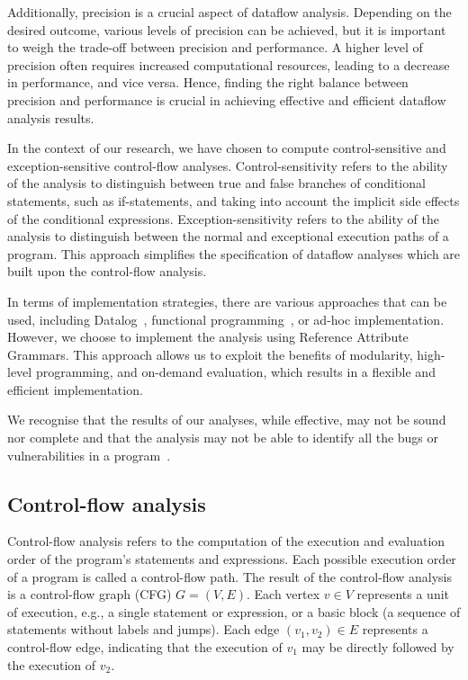 Additionally, precision is a crucial aspect of dataflow analysis.
Depending on the desired outcome, various levels of precision can be achieved,
but it is important to weigh the trade-off between precision and performance.
A higher level of precision often requires increased computational resources,
leading to a decrease in performance, and vice versa. Hence, finding the right
balance between precision and performance is crucial in achieving effective and
efficient dataflow analysis results.

In the context of our research, we have chosen to compute control-sensitive and
exception-sensitive control-flow analyses.
Control-sensitivity refers to the ability of the analysis to distinguish between
true and false branches of conditional statements, such as if-statements, and
taking into account the implicit side effects of the conditional expressions.
Exception-sensitivity refers to the ability of the analysis to distinguish between
the normal and exceptional execution paths of a program.
This approach simplifies the specification of dataflow analyses which are built upon the
control-flow analysis.

In terms of implementation strategies, there are various approaches that can be
used, including Datalog~\cite{dura2021javadl}, functional programming~\cite{madsen2016datalog}, or ad-hoc implementation.
However, we choose to implement the analysis using Reference Attribute Grammars.
This approach allows us to exploit the benefits of modularity, high-level programming,
and on-demand evaluation, which results in a flexible and efficient implementation.

We recognise that the results of our analyses, while effective,
may not be sound nor complete and that the analysis may not be able to identify
all the bugs or vulnerabilities in a program~\cite{livshits2015defense}.





\subsection{Control-flow analysis}
Control-flow analysis refers to the computation of
 the execution and evaluation order of the program's statements and expressions.
Each possible execution order of a program is called a control-flow path.
The result of the control-flow analysis is a control-flow graph (CFG) $G=(V,E)$.
Each vertex $v \in V$ represents a unit of execution, e.g., a single statement or expression,
or a basic block (a sequence of statements without labels and jumps).
Each edge $(v_1,v_2) \in E$  represents a control-flow edge, indicating that the
execution of $v_1$ may be directly followed by the execution of $v_2$.

